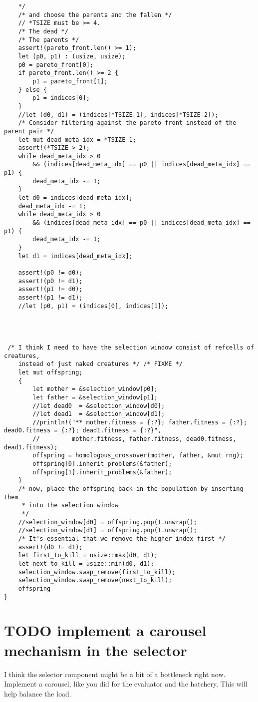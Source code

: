 \documentclass[11pt]{article}
\begin{document}
\begin{lstlisting}
    */
    /* and choose the parents and the fallen */
    // *TSIZE must be >= 4.
    /* The dead */
    /* The parents */
    assert!(pareto_front.len() >= 1);
    let (p0, p1) : (usize, usize);
    p0 = pareto_front[0];
    if pareto_front.len() >= 2 {
        p1 = pareto_front[1];
    } else {
        p1 = indices[0];
    }
    //let (d0, d1) = (indices[*TSIZE-1], indices[*TSIZE-2]);
    /* Consider filtering against the pareto front instead of the parent pair */
    let mut dead_meta_idx = *TSIZE-1;
    assert!(*TSIZE > 2);
    while dead_meta_idx > 0 
        && (indices[dead_meta_idx] == p0 || indices[dead_meta_idx] == p1) {
        dead_meta_idx -= 1;
    }
    let d0 = indices[dead_meta_idx];
    dead_meta_idx -= 1;
    while dead_meta_idx > 0 
        && (indices[dead_meta_idx] == p0 || indices[dead_meta_idx] == p1) {
        dead_meta_idx -= 1;
    }
    let d1 = indices[dead_meta_idx];

    assert!(p0 != d0);
    assert!(p0 != d1);
    assert!(p1 != d0);
    assert!(p1 != d1);
    //let (p0, p1) = (indices[0], indices[1]);




 /* I think I need to have the selection window consist of refcells of creatures, 
    instead of just naked creatures */ /* FIXME */ 
    let mut offspring;
    {
        let mother = &selection_window[p0];
        let father = &selection_window[p1];
        //let dead0  = &selection_window[d0];
        //let dead1  = &selection_window[d1];
        //println!("** mother.fitness = {:?}; father.fitness = {:?}; dead0.fitness = {:?}; dead1.fitness = {:?}",
        //         mother.fitness, father.fitness, dead0.fitness, dead1.fitness);
        offspring = homologous_crossover(mother, father, &mut rng);
        offspring[0].inherit_problems(&father);
        offspring[1].inherit_problems(&father);
    }
    /* now, place the offspring back in the population by inserting them
     * into the selection window
     */
    //selection_window[d0] = offspring.pop().unwrap();
    //selection_window[d1] = offspring.pop().unwrap();
    /* It's essential that we remove the higher index first */
    assert!(d0 != d1);
    let first_to_kill = usize::max(d0, d1);
    let next_to_kill = usize::min(d0, d1);
    selection_window.swap_remove(first_to_kill);
    selection_window.swap_remove(next_to_kill);
    offspring
}
\end{lstlisting}

\section{{\bfseries\sffamily TODO} implement a carousel mechanism in the selector}
\label{sec:org908ef72}

I think the selector component might be a bit of a bottleneck right now. 
Implement a carousel, like you did for the evaluator and the hatchery. 
This will help balance the load. 
\end{document}

